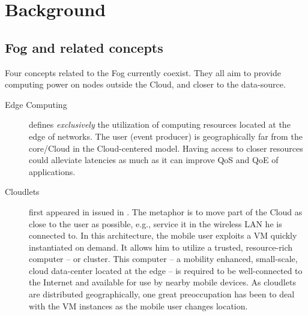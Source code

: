 \documentclass[11pt]{sdm}
\begin{document}
\section{Background}
\label{sec:background}

\subsection{Fog and related concepts}

Four concepts related to the Fog currently coexist. They all aim to provide computing power on nodes outside the Cloud, and closer to the data-source.

\begin{description}
	\item[Edge Computing] defines \emph{exclusively} the utilization of computing resources located at the edge of networks. The user (event producer) is geographically far from the core/Cloud in the Cloud-centered model. Having access to closer resources could alleviate latencies as much as it can improve \gls{QoS} and \gls{QoE} of applications.

	\item[Cloudlets] first appeared in \cite{satyanarayanan_case_2009} issued in . The metaphor is to move part of the Cloud as close to the user as possible, e.g., service it in the wireless LAN he is connected to. In this architecture, the mobile user exploits a \gls{VM} quickly instantiated on demand. It allows him to utilize a trusted, resource-rich computer -- or cluster. This computer -- a mobility enhanced, small-scale, cloud data-center located at the edge -- is required to be well-connected to the Internet and available for use by nearby mobile devices. As cloudlets are distributed geographically, one great preoccupation has been to deal with the \gls{VM} instances as the mobile user changes location.


\end{description}
\end{document}
